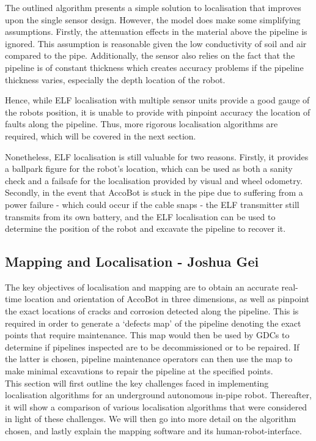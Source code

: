 \documentclass[11pt]{article}		%
\begin{document}
		    \begin{floatingfigure}[r]{0pt} \end{floatingfigure}
		    
			The outlined algorithm presents a simple solution to localisation that improves upon the single sensor design. However, the model does make some simplifying assumptions. Firstly, the attenuation effects in the material above the pipeline is ignored. This assumption is reasonable given the low conductivity of soil and air compared to the pipe. Additionally, the sensor also relies on the fact that the pipeline is of constant thickness which creates accuracy problems if the pipeline thickness varies, especially the depth location of the robot. 
			
			\hspace*{3ex}Hence, while ELF localisation with multiple sensor units provide a good gauge of the robots position, it is unable to provide with pinpoint accuracy the location of faults along the pipeline. Thus, more rigorous localisation algorithms are required, which will be covered in the next section. 
			
			\hspace*{3ex}Nonetheless, ELF localisation is still valuable for two reasons. Firstly, it provides a ballpark figure for the robot's location, which can be used as both a sanity check and a failsafe for the localisation provided by visual and wheel odometry.  Secondly, in the event that AccoBot is stuck in the pipe due to suffering from a power failure - which could occur if the cable snaps - the ELF transmitter still transmits from its own battery, and the ELF localisation can be used to determine the position of the robot and excavate the pipeline to recover it. 
			
		\subsection[Mapping and Localisation]{Mapping and Localisation - Joshua Gei} \label{localisationSection}
		The key objectives of localisation and mapping are to obtain an accurate real-time location and orientation of AccoBot in three dimensions, as well as pinpoint the exact locations of cracks and corrosion detected along the pipeline. This is required in order to generate a ‘defects map’ of the pipeline denoting the exact points that require maintenance. This map would then be used by GDCs to determine if pipelines inspected are to be decommissioned or to be repaired. If the latter is chosen, pipeline maintenance operators can then use the map to make minimal excavations to repair the pipeline at the specified points. 
        \\ \hspace*{3ex}This section will first outline the key challenges faced in implementing localisation algorithms for an underground autonomous in-pipe robot. Thereafter, it will show a comparison of various localisation algorithms that were considered in light of these challenges. We will then go into more detail on the algorithm chosen, and lastly explain the mapping software and its human-robot-interface.
\end{document}
